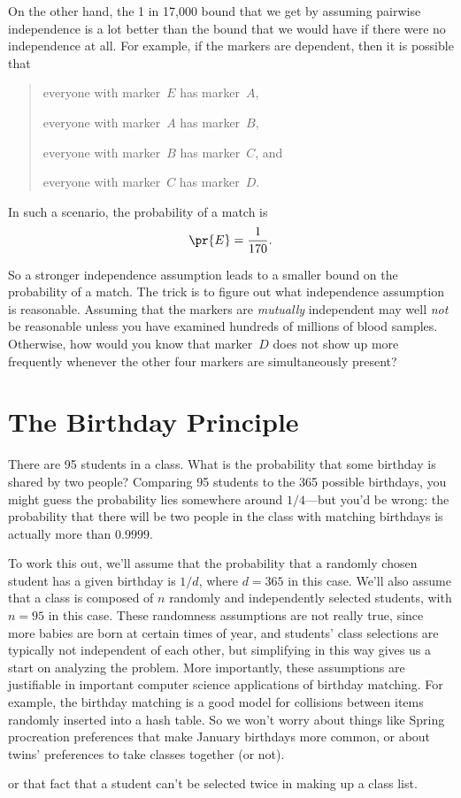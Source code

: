 On the other hand, the 1 in 17,000 bound that we get by assuming
pairwise independence is a lot better than the bound that we would
have if there were no independence at all.  For example, if the
markers are dependent, then it is possible that
\begin{quote}
everyone with marker~$E$ has marker~$A$,

everyone with marker~$A$ has marker~$B$,

everyone with marker~$B$ has marker~$C$, and

everyone with marker~$C$ has marker~$D$.
\end{quote}
In such a scenario, the probability of a match is
\begin{equation*}
    \pr{E} = \frac{1}{170}.
\end{equation*}

So a stronger independence assumption leads to a smaller bound on the
probability of a match.  The trick is to figure out what independence
assumption is reasonable.  Assuming that the markers are
\emph{mutually} independent may well \emph{not} be reasonable unless
you have examined hundreds of millions of blood samples.  Otherwise,
how would you know that marker~$D$ does not show up more frequently
whenever the other four markers are simultaneously present?

\iffalse

\section{The Birthday Principle}\label{birthday_principle_sec}

There are 95 students in a class.  What is the probability that some
birthday is shared by two people?  Comparing 95 students to the 365
possible birthdays, you might guess the probability lies somewhere
around $1/4$---but you'd be wrong: the probability that there will be
two people in the class with matching birthdays is actually more than
$0.9999$.

To work this out, we'll assume that the probability that a randomly
chosen student has a given birthday is $1/d$, where $d= 365$ in this
case.  We'll also assume that a class is composed of $n$ randomly and
independently selected students, with $n=95$ in this case.  These
randomness assumptions are not really true, since more babies are born
at certain times of year, and students' class selections are typically
not independent of each other, but simplifying in this way gives us a
start on analyzing the problem.  More importantly, these assumptions
are justifiable in important computer science applications of birthday
matching.  For example, the birthday matching is a good model for
collisions between items randomly inserted into a hash table.  So we
won't worry about things like Spring procreation preferences that make
January birthdays more common, or about twins' preferences to take
classes together (or not).  \begin{editingnotes}
or that fact that a student
can't be selected twice in making up a class list.
\end{editingnotes}

